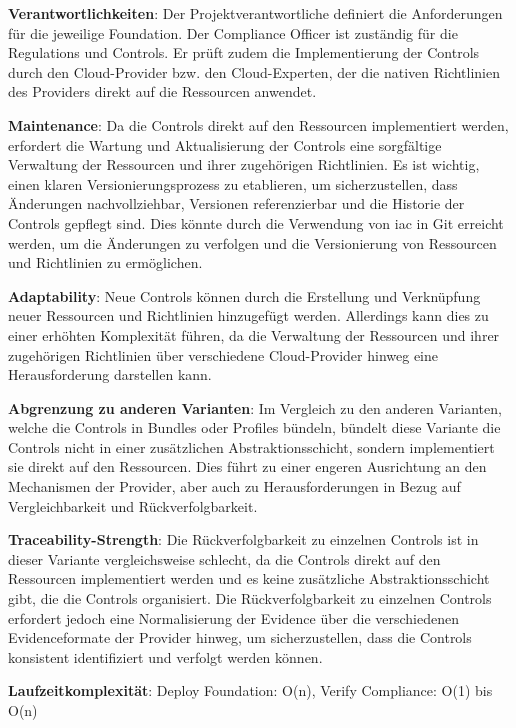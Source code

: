 \textbf{Verantwortlichkeiten}: Der Projektverantwortliche definiert die Anforderungen für die jeweilige Foundation. Der Compliance Officer ist zuständig für die Regulations und Controls. Er prüft zudem die Implementierung der Controls durch den Cloud-Provider bzw. den Cloud-Experten, der die nativen Richtlinien des Providers direkt auf die Ressourcen anwendet.

\textbf{Maintenance}: Da die Controls direkt auf den Ressourcen implementiert werden, erfordert die Wartung und Aktualisierung der Controls eine sorgfältige Verwaltung der Ressourcen und ihrer zugehörigen Richtlinien. Es ist wichtig, einen klaren Versionierungsprozess zu etablieren, um sicherzustellen, dass Änderungen nachvollziehbar, Versionen referenzierbar und die Historie der Controls gepflegt sind. Dies könnte durch die Verwendung von \ac{iac} in Git erreicht werden, um die Änderungen zu verfolgen und die Versionierung von Ressourcen und Richtlinien zu ermöglichen.

\textbf{Adaptability}: Neue Controls können durch die Erstellung und Verknüpfung neuer Ressourcen und Richtlinien hinzugefügt werden. Allerdings kann dies zu einer erhöhten Komplexität führen, da die Verwaltung der Ressourcen und ihrer zugehörigen Richtlinien über verschiedene Cloud-Provider hinweg eine Herausforderung darstellen kann.

\textbf{Abgrenzung zu anderen Varianten}: Im Vergleich zu den anderen Varianten, welche die Controls in Bundles oder Profiles bündeln, bündelt diese Variante die Controls nicht in einer zusätzlichen Abstraktionsschicht, sondern implementiert sie direkt auf den Ressourcen. Dies führt zu einer engeren Ausrichtung an den Mechanismen der Provider, aber auch zu Herausforderungen in Bezug auf Vergleichbarkeit und Rückverfolgbarkeit.

\textbf{Traceability-Strength}: Die Rückverfolgbarkeit zu einzelnen Controls ist in dieser Variante vergleichsweise schlecht, da die Controls direkt auf den Ressourcen implementiert werden und es keine zusätzliche Abstraktionsschicht gibt, die die Controls organisiert. Die Rückverfolgbarkeit zu einzelnen Controls erfordert jedoch eine Normalisierung der Evidence über die verschiedenen Evidenceformate der Provider hinweg, um sicherzustellen, dass die Controls konsistent identifiziert und verfolgt werden können.

\textbf{Laufzeitkomplexität}: Deploy Foundation: O(n), Verify Compliance: O(1) bis O(n)


